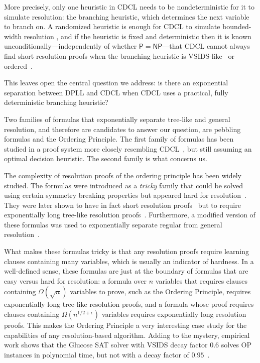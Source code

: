 \documentclass[10pt,a4paper]{article}
\begin{document}
More precisely, only one heuristic in CDCL needs to be nondeterministic for it to simulate resolution: the branching heuristic, which determines the next variable to branch on. A randomized heuristic is enough for CDCL to simulate bounded-width resolution \cite{manyrestarts}, and if the heuristic is fixed and deterministic then it is known unconditionally---independently of whether $\mathsf{P}=\mathsf{NP}$---that CDCL cannot always find short resolution proofs when the branching heuristic is VSIDS-like~\cite{pitfall} or ordered~\cite{DBLP:journals/siamcomp/MullPR22}.

This leaves open the central question we address: is there an exponential separation between DPLL and CDCL when CDCL uses a practical, fully deterministic branching heuristic?

Two families of formulas that exponentially separate tree-like and general resolution, and therefore are candidates to answer our question, are pebbling formulas and the Ordering Principle. The first family of formulas has been studied in a proof system more closely resembling CDCL~\cite{elffers2016trade}, but still assuming an optimal decision heuristic. The second family is what concerns us.

The complexity of resolution proofs of the ordering principle has been widely studied. The formulas were introduced as a \emph{tricky} family that could be solved using certain symmetry breaking properties but appeared hard for resolution~\cite{krishnamurthy1985short}. They were later shown to have in fact short resolution proofs~\cite{staalmarck1996short} but to require exponentially long tree-like resolution proofs~\cite{bonet-galesi}. Furthermore, a modified version of these formulas was used to exponentially separate regular from general resolution~\cite{alekhnovich2007exponential}.

What makes these formulas tricky is that any resolution proofs require learning clauses containing many variables, which is usually an indicator of hardness. In a well-defined sense, these formulas are just at the boundary of formulas that are easy versus hard for resolution: a formula over $n$ variables that requires clauses containing $\Omega(\sqrt{n})$ variables to prove, such as the Ordering Principle, requires exponentially long tree-like resolution proofs, and a formula whose proof requires clauses containing $\Omega(n^{1/2+\epsilon})$ variables requires exponentially long resolution proofs. This makes the Ordering Principle a very interesting case study for the capabilities of any resolution-based algorithm. Adding to the mystery, empirical work shows that the Glucose SAT solver with VSIDS decay factor $0.6$ solves OP instances in polynomial time, but not with a decay factor of $0.95$~\cite{elffers2018seeking}.
\end{document}
